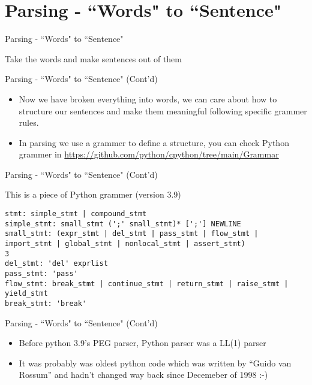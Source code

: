 \section{Parsing - ``Words" to ``Sentence"}
\begin{frame}{Parsing - ``Words" to ``Sentence"}
\begin{itemize}
{\LARGE \item[-] Take the words and make sentences out of them}
\end{itemize}
\end{frame}

\begin{frame}{Parsing - ``Words" to ``Sentence" (Cont'd)}
\begin{itemize}
\item[-] Now we have broken everything into words, we can care about how to structure our sentences
and make them meaningful following specific grammer rules. 

\item[-]
In parsing we use a grammer
to define a structure, you can check Python grammer in \url{https://github.com/python/cpython/tree/main/Grammar}
\end{itemize}
\end{frame}

\begin{frame}[fragile]{Parsing - ``Words" to ``Sentence" (Cont'd)}
\begin{flushleft}
This is a piece of Python grammer (version 3.9)
\begin{lstlisting}[numbers=none]
stmt: simple_stmt | compound_stmt
simple_stmt: small_stmt (';' small_stmt)* [';'] NEWLINE
small_stmt: (expr_stmt | del_stmt | pass_stmt | flow_stmt |
import_stmt | global_stmt | nonlocal_stmt | assert_stmt)
3
del_stmt: 'del' exprlist
pass_stmt: 'pass'
flow_stmt: break_stmt | continue_stmt | return_stmt | raise_stmt |
yield_stmt
break_stmt: 'break'
\end{lstlisting}
\end{flushleft}
\end{frame}

\begin{frame}{Parsing - ``Words" to ``Sentence" (Cont'd)}
\begin{itemize}
\item[-]<1> Before python 3.9’s PEG parser, Python parser was a LL(1) parser

\item[-]<2> It was probably was oldest python code which was written by “Guido van Rossum” and hadn’t changed way back since
Decemeber of 1998 :-)

\end{itemize}
\end{frame}